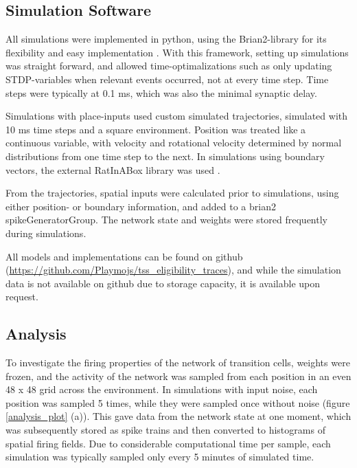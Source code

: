 \documentclass{article}
\begin{document}
    \subsection{Simulation Software} \label{Sim software}
    
    All simulations were implemented in python, using the Brian2-library for its flexibility and easy implementation \parencite{Brian2}. With this framework, setting up simulations was straight forward, and allowed time-optimalizations such as only updating STDP-variables when relevant events occurred, not at every time step. Time steps were typically at 0.1 ms, which was also the minimal synaptic delay.
    
    Simulations with place-inputs used custom simulated trajectories, simulated with 10 ms time steps and a square environment. Position was treated like a continuous variable, with velocity and rotational velocity determined by normal distributions from one time step to the next. In simulations using boundary vectors, the external RatInABox library was used \parencite{RatInABox}. 
    
    From the trajectories, spatial inputs were calculated prior to simulations, using either position- or boundary information, and added to a brian2 spikeGeneratorGroup. The network state and weights were stored frequently during simulations.

    All models and implementations can be found on github (\url{https://github.com/Playmojs/tss_eligibility_traces}), and while the simulation data is not available on github due to storage capacity, it is available upon request.

    \subsection{Analysis} \label{Analysis}
    To investigate the firing properties of the network of transition cells, weights were frozen, and the activity of the network was sampled from each position in an even 48 x 48 grid across the environment. In simulations with input noise, each position was sampled 5 times, while they were sampled once without noise (figure \ref{analysis_plot} (a)). This gave data from the network state at one moment, which was subsequently stored as spike trains and then converted to histograms of spatial firing fields. Due to considerable computational time per sample, each simulation was typically sampled only every 5 minutes of simulated time.
\end{document}
